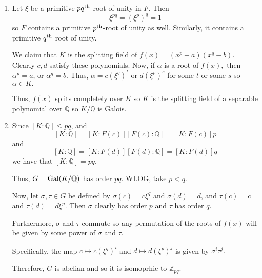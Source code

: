\documentclass[12pt]{AlgebraQual}
\begin{document}
\begin{solution}$\,$
\begin{enumerate}[label=(\alph*)]
    \item Let $\xi$ be a primitive $pq^\text{th}$-root of unity in $F$. Then $$\xi^{pq}=(\xi^p)^q=1$$ so $F$ contains a primitive $p^\text{th}$-root of unity as well. Similarly, it contains a primitive $q^\text{th}$ root of unity.

    We claim that $K$ is the splitting field of $f(x)=(x^p-a)(x^q-b)$. Clearly $c,d$ satisfy these polynomials. Now, if $\alpha$ is a root of $f(x),$ then $\alpha^p=a$, or $\alpha^q=b$. Thus, $\alpha=c(\xi^q)^t$ or $d(\xi^p)^s$ for some $t$ or some $s$ so $\alpha\in K.$

    Thus, $f(x)$ splits completely over $K$ so $K$ is the splitting field of a separable polynomial over $\mathbb{Q}$ so $K/\mathbb{Q}$ is Galois.

    \item
    Since $[K:\mathbb{Q}]\le pq$, and $$[K:\mathbb{Q}]=[K:F(c)][F(c):\mathbb{Q}]=[K:F(c)]p$$ and $$[K:\mathbb{Q}]=[K:F(d)][F(d):\mathbb{Q}]=[K:F(d)]q$$ we have that $[K:\mathbb{Q}]=pq.$

    Thus, $G=\text{Gal}(K/\mathbb{Q})$ has order $pq.$ WLOG, take $p<q$.

    Now, let $\sigma,\tau\in G$ be defined by $\sigma(c)=c\xi^q$ and $\sigma(d)=d$, and $\tau(c)=c$ and $\tau(d)=d\xi^p$. Then $\sigma$ clearly has order $p$ and $\tau$ has order $q$.

    Furthermore, $\sigma$ and $\tau$ commute so any permutation of the roots of $f(x)$ will be given by some power of $\sigma$ and $\tau.$

    Specifically, the map $c\mapsto c(\xi^q)^i$ and $d\mapsto d(\xi^p)^j$ is given by $\sigma^i\tau^j.$

    Therefore, $G$ is abelian and so it is isomoprhic to $\mathbb{Z}_{pq}.$


    \begin{comment}
    Namely, $\langle\sigma\rangle$ generates a Sylow $p$-subgroup and $\langle\tau\rangle$ generates a Sylow $q$-subgroup.

    Finally, by Sylow, $n_q=1$ since $n_q|p$ and $n_q\equiv 1\mod q$ but $p<q.$

    Thus, $\langle\tau\rangle$ is the unique Sylow $q$-subgroup, and since it commutes with $\langle\sigma\rangle$,

    Since $\sigma$ and $\tau$ commute, we actually have that any


    Then If $p\nmid|(q-1)$ then by Sylow, $n_p\equiv 1\mod p$ and $n_p|q$ so $n_p=1$.


\end{comment}
\end{enumerate}
\end{solution}
\end{document}
